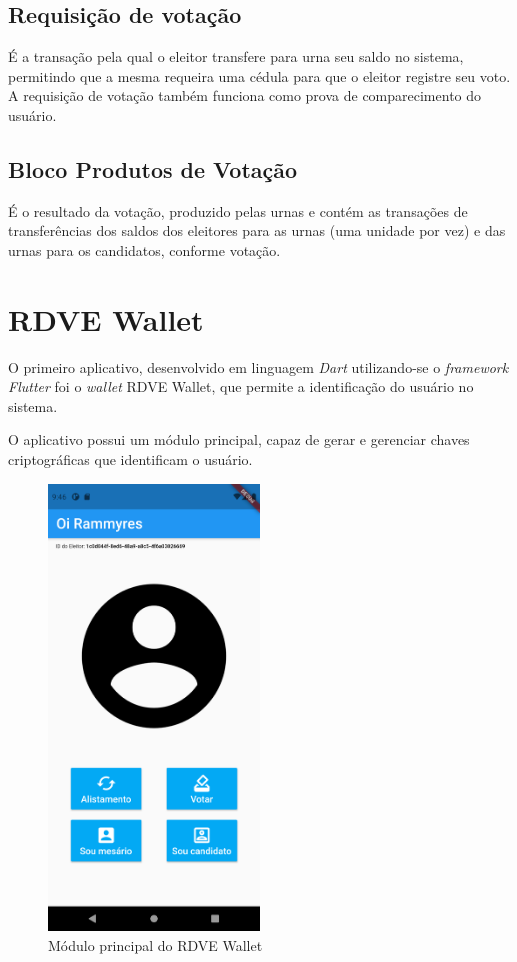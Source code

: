 \subsection{Requisição de votação}
É a transação pela qual o eleitor transfere para urna seu saldo no sistema, permitindo que a mesma requeira uma cédula para que o eleitor registre seu voto. A requisição de votação também funciona como prova de comparecimento do usuário. 

\subsection{Bloco Produtos de Votação}

É o resultado da votação, produzido pelas urnas e contém as transações de transferências dos saldos dos eleitores para as urnas (uma unidade por vez) e das urnas para os candidatos, conforme votação.

\section{RDVE Wallet}

O primeiro aplicativo, desenvolvido em linguagem \textit{Dart} utilizando-se o \textit{framework Flutter} foi o \textit{\gls{wallet}} RDVE Wallet, que permite a identificação do usuário no sistema. 

O aplicativo possui um módulo principal, capaz de gerar e gerenciar chaves criptográficas que identificam o usuário. 

\begin{figure}[!h]
	\centering
	\includegraphics[width=0.5\textwidth]{imagens/wallet1}
	\caption{Módulo principal do RDVE Wallet}
	\label{fig:wallet1}
\end{figure}
\clearpage


